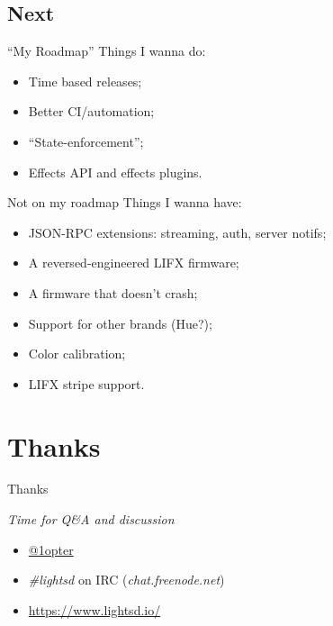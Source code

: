 \documentclass{lgtdslides}
\begin{document}
\subsection{Next}

\begin{frame}{``My Roadmap''}
Things I wanna do:
\vspace{1em}
\begin{itemize}
\item Time based releases;
\item Better CI/automation;
\item ``State-enforcement'';
\item Effects API and effects plugins.
\end{itemize}
\end{frame}

\begin{frame}{Not on my roadmap}
Things I wanna have:
\vspace{1em}
\begin{itemize}
\item JSON-RPC extensions: streaming, auth, server notifs;
\item A reversed-engineered LIFX firmware;
\item A firmware that doesn't crash;
\item Support for other brands (Hue?);
\item Color calibration;
\item LIFX stripe support.
\end{itemize}
\end{frame}

\section{Thanks}

{
\begin{frame}
\begin{center}\Huge{Thanks}\end{center}
\vspace{1em}
\begin{center}\Large{\emph{Time for Q\&A and discussion}}\end{center}
\vspace{1em}
\begin{itemize}
\item \Large{\href{https://twitter.com/1opter}{@1opter}}
\item \Large{\emph{\#lightsd} on IRC (\emph{chat.freenode.net})}
\item \Large{\url{https://www.lightsd.io/}}
\end{itemize}
\end{frame}}
\end{document}
